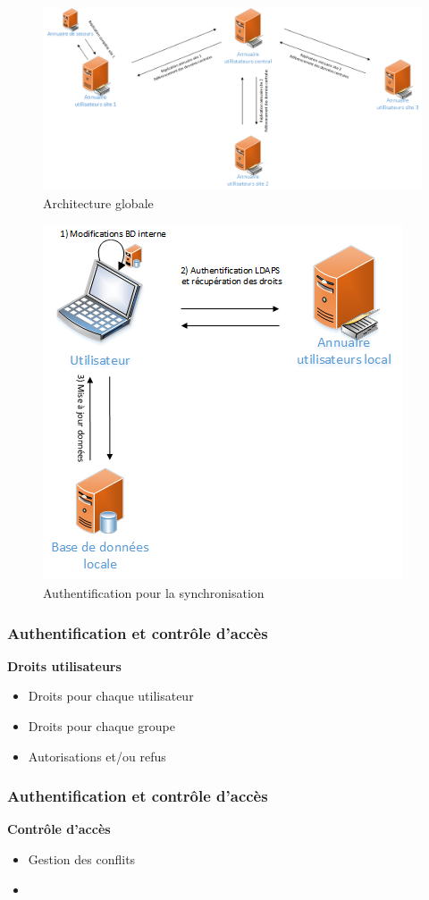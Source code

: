   \begin{figure}[htbp]
	\centering
	\includegraphics[scale=0.4]{Images/SchemaGlobal.png}
	\caption{Architecture globale}
	\label{SchemaGlobal}
\end{figure}

\begin{figure}[htbp]
	\centering
	\includegraphics[scale=0.6]{Images/SchemaAuthentification.png}
	\caption{Authentification pour la synchronisation}
	\label{SchemaAuthentification}
\end{figure}

\begin{frame}
  \frametitle{Authentification et contrôle d'accès}
  \begin{block}{\textbf{Droits utilisateurs}}
  \begin{itemize}
  \item Droits pour chaque utilisateur
  \item Droits pour chaque groupe
  \item Autorisations et/ou refus
  \end{itemize}
  \end{block}
\end{frame}

\begin{frame}
  \frametitle{Authentification et contrôle d'accès}
  \begin{block}{\textbf{Contrôle d'accès}}
  \begin{itemize}
  \item Gestion des conflits 
  \item 
  \end{itemize}
  \end{block}
\end{frame}